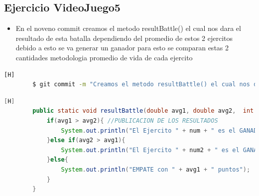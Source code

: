 \documentclass{article}
\begin{document}
	\subsection{Ejercicio VideoJuego5}
	\begin{itemize}	
		\item En el noveno commit creamos el metodo resultBattle() el cual nos dara el resultado de esta batalla dependiendo del promedio de estos 2 ejercitos debido a esto se va generar un ganador para esto se comparan estas 2 cantidades metodologia promedio de vida de cada ejercito
	\end{itemize}	
	\begin{lstlisting}[language=bash,caption={Commit}][H]
		$ git commit -m "Creamos el metodo resultBattle() el cual nos dara el resultado de esta batalla dependiendo del promedio de estos 2 ejercitos debido a esto se va generar un ganador para esto se comparan estas 2 cantidades metodologia promedio de vida de cada ejercito"
	\end{lstlisting}	
	\begin{lstlisting}[language=java,caption={Las lineas de codigos del metodo creado:}][H]
		public static void resultBattle(double avg1, double avg2,  int num, int num2){ //METODO CREADO PARA PODER SABER EL RESULTADO DE ESTA BATALLA ENTRE ESTOS 2 EJERCITOS
			if(avg1 > avg2){ //PUBLICACION DE LOS RESULTADOS
				System.out.println("El Ejercito " + num + " es el GANADOR con " + avg1+ " puntos");
			}else if(avg2 > avg1){
				System.out.println("El Ejercito " + num2 + " es el GANADOR con " + avg2 + " puntos");
			}else{
				System.out.println("EMPATE con " + avg1 + " puntos");
			}
		}
	\end{lstlisting}
\end{document}
